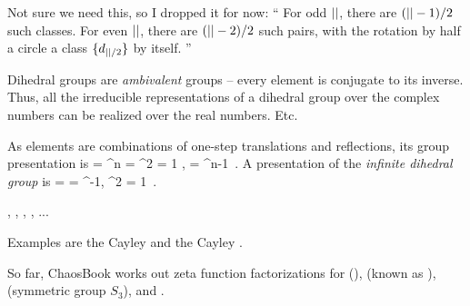 Not sure we need this, so I dropped it for now: ``
For odd ${||}$, there are $({||}-1)/2$ such classes.
For even ${||}$, there are $({||}-2)/2$ such pairs, with the rotation
by half a circle a class  $\{d_{{||}/2}\}$ by itself. ''

    Dihedral groups are \emph{ambivalent }groups -- every element is
conjugate to its inverse. Thus, all the irreducible representations of a
dihedral group over the complex numbers can be realized over the real
numbers. Etc.


As  elements are combinations of one-step translations and reflections,
its group presentation is
\beq
   = \left\langle {\shift, \Refl} \mid \shift^n = \Refl^2 = 1 ,
                        \shift\Refl= \Refl \shift^{n-1}
            \right\rangle
\,.
A presentation of the \emph{infinite dihedral group} is
\beq
\Dn{\infty} = \left\langle {\shift, \Refl} \mid
            \Refl \shift\Refl= \shift^{-1}, \Refl^2 = 1
              \right\rangle
\,.


, ,
, , ...

Examples are the  Cayley 
and the  Cayley .

So far, ChaosBook works out zeta function factorizations for 
(),    %
 (known as
),
 (symmetric group $S_3$), and .

\medskip


%
%




